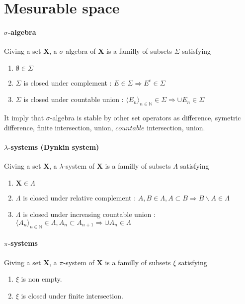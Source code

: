 \documentclass[a4paper,10pt]{article}
\begin{document}
\section{Mesurable space}
\paragraph{$\sigma$-algebra} Giving a set $\textbf{X}$, a $\sigma$-algebra of $\textbf{X}$ is a familly of subsets $\Sigma$ satisfying 
\begin{enumerate}
 \item $\emptyset \in \Sigma$
 \item $\Sigma$ is closed under complement : $ E \in \Sigma \Longrightarrow E^{c} \in \Sigma$
 \item $\Sigma$ is closed under countable union : $ \langle E_{n} \rangle_{n \in \mathbb{N}} \in \Sigma \Longrightarrow \cup E_{n} \in \Sigma $ 
\end{enumerate}
It imply that $\sigma$-algebra is stable by other set operators as difference, symetric difference, finite intersection, union, $\textit{countable}$ intersection, union. 

\paragraph{$\lambda$-systems (Dynkin system)} Giving a set $\textbf{X}$, a $\lambda$-system of $\textbf{X}$ is a familly of subsets $\varLambda$ satisfying 
\begin{enumerate}
 \item $\textbf{X} \in \varLambda$
 \item $\varLambda$ is closed under relative complement : $ A,B \in \varLambda, A \subset B \Longrightarrow B \backslash A \in \varLambda$
 \item $\varLambda$ is closed under increasing countable union : $ \langle A_{n} \rangle_{n \in \mathbb{N}} \in \varLambda, A_n \subset A_{n+1} \Longrightarrow \cup A_{n} \in \varLambda $ 
\end{enumerate}


\paragraph{$\pi$-systems} Giving a set $\textbf{X}$, a $\pi$-system of $\textbf{X}$ is a familly of subsets $\xi$ satisfying 
\begin{enumerate}
 \item $\xi$ is non empty.
 \item $\xi$ is closed under finite intersection.
\end{enumerate}
\end{document}
